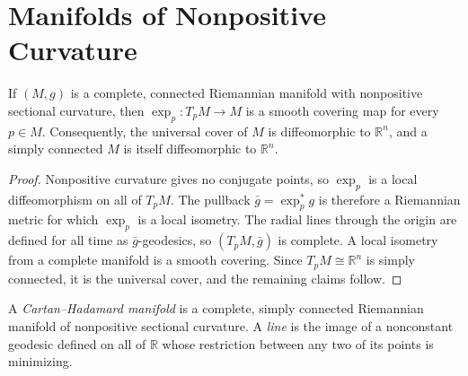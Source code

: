 \section{Manifolds of Nonpositive Curvature}

\begin{theorem}
\label{thm:cartan-hadamard}





If $(M,g)$ is a complete, connected Riemannian manifold with nonpositive
sectional curvature, then $\exp_p:T_pM\to M$ is a smooth covering map for
every $p\in M$.  Consequently, the universal cover of $M$ is diffeomorphic to
$\mathbb R^n$, and a simply connected $M$ is itself diffeomorphic to
$\mathbb R^n$.
\begin{proof}
\sketch Nonpositive curvature gives no conjugate points, so $\exp_p$ is a
local diffeomorphism on all of $T_pM$.  The pullback $\bar g=\exp_p^*g$ is
therefore a Riemannian metric for which $\exp_p$ is a local isometry.  The
radial lines through the origin are defined for all time as $\bar g$-geodesics,
so $(T_pM,\bar g)$ is complete.  A local isometry from a complete manifold is
a smooth covering.  Since $T_pM\cong\mathbb R^n$ is simply connected, it is
the universal cover, and the remaining claims follow.
\end{proof}
\end{theorem}

A \emph{Cartan--Hadamard manifold} is a complete, simply connected Riemannian
manifold of nonpositive sectional curvature.  A \emph{line} is the image of a
nonconstant geodesic defined on all of $\mathbb R$ whose restriction between
any two of its points is minimizing.

